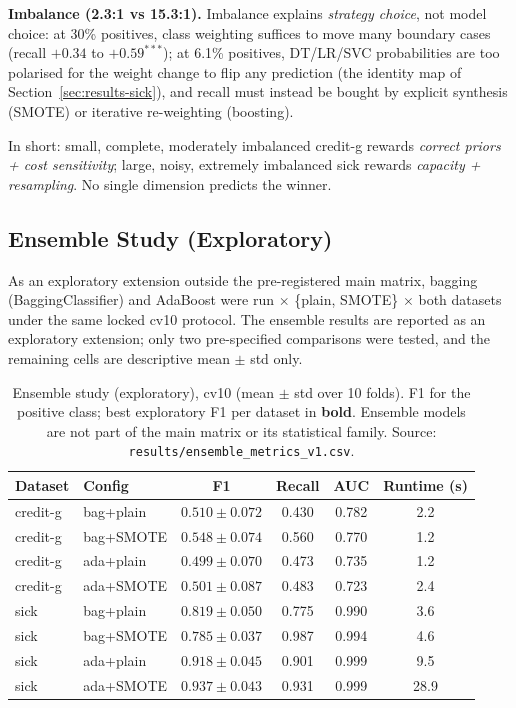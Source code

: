 \textbf{Imbalance (2.3:1 vs 15.3:1).} Imbalance explains \emph{strategy choice}, not model choice: at 30\% positives, class weighting suffices to move many boundary cases (recall $+0.34$ to $+0.59^{***}$); at 6.1\% positives, DT/LR/SVC probabilities are too polarised for the weight change to flip any prediction (the identity map of Section~\ref{sec:results-sick}), and recall must instead be bought by explicit synthesis (SMOTE) or iterative re-weighting (boosting).

In short: small, complete, moderately imbalanced credit-g rewards \emph{correct priors + cost sensitivity}; large, noisy, extremely imbalanced sick rewards \emph{capacity + resampling}. No single dimension predicts the winner.

\subsection{Ensemble Study (Exploratory)}
\label{sec:results-ensemble}

As an exploratory extension outside the pre-registered main matrix, bagging (BaggingClassifier) and AdaBoost were run $\times$ \{plain, SMOTE\} $\times$ both datasets under the same locked cv10 protocol. The ensemble results are reported as an exploratory extension; only two pre-specified comparisons were tested, and the remaining cells are descriptive mean $\pm$ std only.

\begin{table}[H]
\centering
\caption{Ensemble study (exploratory), cv10 (mean $\pm$ std over 10 folds). F1 for the positive class; best exploratory F1 per dataset in \textbf{bold}. Ensemble models are not part of the main matrix or its statistical family. Source: \texttt{results/ensemble\_metrics\_v1.csv}.}
\label{tab:ensemble}
\begin{tabular}{llcccc}
\toprule
Dataset & Config & F1 & Recall & AUC & Runtime (s) \\
\midrule
credit-g & bag+plain & $0.510\pm0.072$ & 0.430 & 0.782 & 2.2 \\
credit-g & bag+SMOTE & $0.548\pm0.074$ & 0.560 & 0.770 & 1.2 \\
credit-g & ada+plain & $0.499\pm0.070$ & 0.473 & 0.735 & 1.2 \\
credit-g & ada+SMOTE & $0.501\pm0.087$ & 0.483 & 0.723 & 2.4 \\
\midrule
sick & bag+plain & $0.819\pm0.050$ & 0.775 & 0.990 & 3.6 \\
sick & bag+SMOTE & $0.785\pm0.037$ & 0.987 & 0.994 & 4.6 \\
sick & ada+plain & $0.918\pm0.045$ & 0.901 & 0.999 & 9.5 \\
sick & ada+SMOTE & $\mathbf{0.937\pm0.043}$ & 0.931 & 0.999 & 28.9 \\
\bottomrule
\end{tabular}
\end{table}

